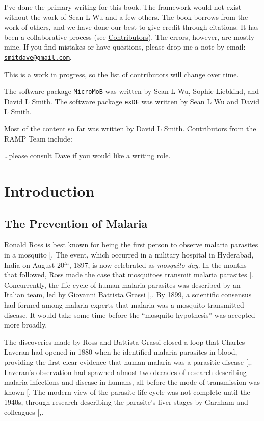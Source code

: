 \documentclass[
]{book}
\begin{document}
I've done the primary writing for this book. The framework would not exist without the work of Sean L Wu and a few others. The book borrows from the work of others, and we have done our best to give credit through citations. It has been a collaborative process (see \hyperref[contributors]{Contributors}). The errors, however, are mostly mine. If you find mistakes or have questions, please drop me a note by email: \href{mailto:smitdave@gmail.com}{\nolinkurl{smitdave@gmail.com}}.

This is a work in progress, so the list of contributors will change over time.

The software package \texttt{MicroMoB} was written by Sean L Wu, Sophie Liebkind, and David L Smith. The software package \texttt{exDE} was written by Sean L Wu and David L Smith.

Most of the content so far was written by David L Smith. Contributors from the RAMP Team include:

\ldots please consult Dave if you would like a writing role.

\part{Introduction}\label{part-introduction}

\chapter{The Prevention of Malaria}\label{the-prevention-of-malaria}

Ronald Ross is best known for being the first person to observe malaria parasites in a mosquito {[}\citeproc{ref-RossR1897PeculiarPigmented}{14}{]}. The event, which occurred in a military hospital in Hyderabad, India on August 20\(^{th}\), 1897, is now celebrated as \emph{mosquito day}.
In the months that followed, Ross made the case that mosquitoes transmit malaria parasites {[}\citeproc{ref-RossR1898RoleMosquito}{15}{]}.
Concurrently, the life-cycle of human malaria parasites was described by an Italian team, led by Giovanni Battista Grassi {[},\citeproc{ref-GrassiB1901StudiDi}{17}{]}.
By 1899, a scientific consensus had formed among malaria experts that malaria was a mosquito-transmitted disease.
It would take some time before the ``mosquito hypothesis'' was accepted more broadly.

The discoveries made by Ross and Battista Grassi closed a loop that Charles Laveran had opened in 1880 when he identified malaria parasites in blood, providing the first clear evidence that human malaria was a parasitic disease {[},\citeproc{ref-Laveran1884}{19}{]}.
Laveran's observation had spawned almost two decades of research describing malaria infections and disease in humans, all before the mode of transmission was known {[}\citeproc{ref-GarnhamPCC1988HistoryDiscoveries}{20}{]}.
The modern view of the parasite life-cycle was not complete until the 1940s, through research describing the parasite's liver stages by Garnham and colleagues {[},\citeproc{ref-ShorttHE1948PreerythrocyticStage}{21}{]}.
\end{document}
